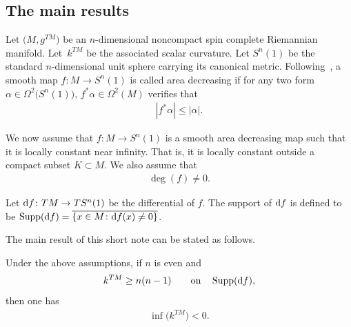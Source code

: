 \subsection{The main results}\label{s1.1}

Let $\big(M,g^{TM}\big)$ be an $n$-dimensional noncompact spin complete Riemannian manifold. Let~$k^{TM}$ be the associated scalar curvature. Let $S^n(1)$ be the standard $n$-dimensional unit sphere carrying its canonical metric. Following~\cite{GL83}, a smooth map $f\colon M \rightarrow S^n(1)$ is called area decreasing if for any two form $\alpha\in\Omega^2\big(S^n(1)\big)$, $f^*\alpha\in\Omega^2(M)$ verifies that
\begin{gather}\label{1.1}
|f^*\alpha|\leq |\alpha|.
\end{gather}

We now assume that $f\colon M\rightarrow S^n(1)$ is a smooth area decreasing map such that it is locally constant near infinity. That is, it is locally constant outside a compact subset $K\subset M$. We also assume that
\begin{gather}\label{1.2}
\deg (f)\neq 0.
\end{gather}

Let ${\rm d}f\colon TM\rightarrow TS^n(1)$ be the differential of $f$. The support of ${\rm d}f$ is defined to be $\operatorname{Supp}({\rm d}f)=\overline{\{ x\in M\colon {\rm d}f(x)\neq 0\}}$.

The main result of this short note can be stated as follows.

\begin{thm}\label{t1.1} Under the above assumptions, if $n$ is even and
\begin{gather}\label{1.3}
k^{TM}\geq n(n-1) \qquad {\rm on}\quad \operatorname{Supp}({\rm d}f),
\end{gather}
then one has
\begin{gather}\label{1.4}
\inf \big(k^{TM}\big)<0.
\end{gather}
\end{thm}
